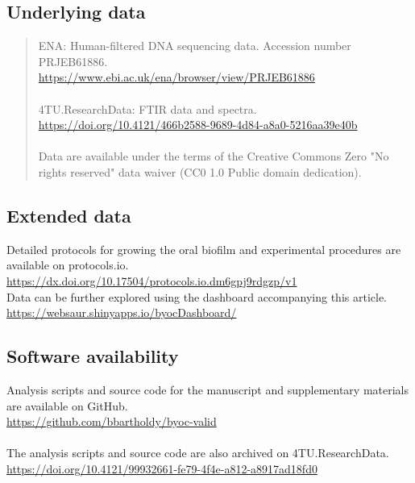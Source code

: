 \documentclass[10pt,a4paper]{article}
\begin{document}
\subsection*{Underlying data}
\begin{quote}
ENA: Human-filtered DNA sequencing data. Accession number PRJEB61886.\\
\href{https://www.ebi.ac.uk/ena/browser/view/PRJEB61886}{https://www.ebi.ac.uk/ena/browser/view/PRJEB61886}
\\
\\
4TU.ResearchData: FTIR data and spectra.\\
\href{https://doi.org/10.4121/466b2588-9689-4d84-a8a0-5216aa39e40b}{https://doi.org/10.4121/466b2588-9689-4d84-a8a0-5216aa39e40b}
\\
\\
Data are available under the terms of the Creative Commons Zero "No rights reserved" data waiver (CC0 1.0 Public domain dedication).
\end{quote}

\subsection*{Extended data}
Detailed protocols for growing the oral biofilm and experimental procedures are available on protocols.io.\\
\href{https://dx.doi.org/10.17504/protocols.io.dm6gpj9rdgzp/v1}{https://dx.doi.org/10.17504/protocols.io.dm6gpj9rdgzp/v1}\\

Data can be further explored using the dashboard accompanying this article.\\
\href{https://websaur.shinyapps.io/byocDashboard/}{https://websaur.shinyapps.io/byocDashboard/}

\subsection*{Software availability}
Analysis scripts and source code for the manuscript and supplementary materials
are available on GitHub.\\
\href{https://github.com/bbartholdy/byoc-valid}{https://github.com/bbartholdy/byoc-valid}\\
\\
The analysis scripts and source code are also archived on 4TU.ResearchData.\\
\href{https://doi.org/10.4121/99932661-fe79-4f4e-a812-a8917ad18fd0}{https://doi.org/10.4121/99932661-fe79-4f4e-a812-a8917ad18fd0}
\end{document}
